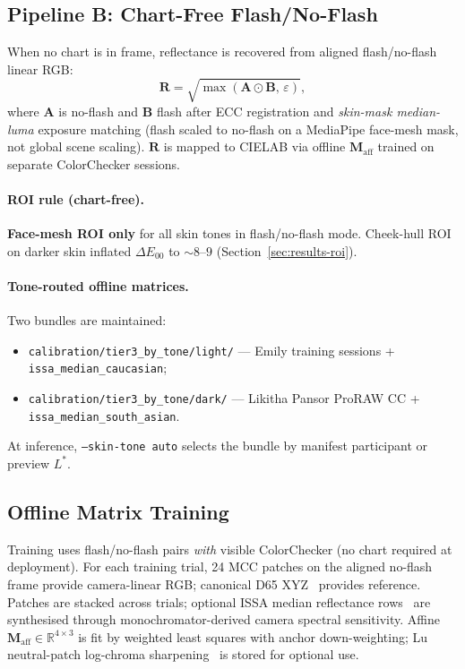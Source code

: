 \documentclass[11pt]{article}
\newcommand{\deee}{\ensuremath{\Delta E_{00}}}
\newcommand{\Maff}{\mathbf{M}_{\mathrm{aff}}}
\newcommand{\Rvec}{\mathbf{R}}
\begin{document}
\subsection{Pipeline B: Chart-Free Flash/No-Flash}

When no chart is in frame, reflectance is recovered from aligned flash/no-flash linear RGB:
\begin{equation}\label{eq:reflectance}
  \Rvec = \sqrt{\max(\mathbf{A}\odot\mathbf{B},\,\varepsilon)},
\end{equation}
where $\mathbf{A}$ is no-flash and $\mathbf{B}$ flash after ECC registration and \emph{skin-mask median-luma} exposure matching (flash scaled to no-flash on a MediaPipe face-mesh mask, not global scene scaling).
$\Rvec$ is mapped to CIELAB via offline $\Maff$ trained on separate ColorChecker sessions.

\paragraph{ROI rule (chart-free).}
\textbf{Face-mesh ROI only} for all skin tones in flash/no-flash mode.
Cheek-hull ROI on darker skin inflated $\deee$ to ${\sim}8$--$9$ (Section~\ref{sec:results-roi}).

\paragraph{Tone-routed offline matrices.}
Two bundles are maintained:
\begin{itemize}[noitemsep]
  \item \texttt{calibration/tier3\_by\_tone/light/} --- Emily training sessions + \texttt{issa\_median\_caucasian};
  \item \texttt{calibration/tier3\_by\_tone/dark/} --- Likitha Pansor ProRAW CC + \texttt{issa\_median\_south\_asian}.
\end{itemize}
At inference, \texttt{--skin-tone auto} selects the bundle by manifest participant or preview $L^*$.

\subsection{Offline Matrix Training}

Training uses flash/no-flash pairs \emph{with} visible ColorChecker (no chart required at deployment).
For each training trial, 24 MCC patches on the aligned no-flash frame provide camera-linear RGB; canonical D65 XYZ~\cite{BabelColorMCC} provides reference.
Patches are stacked across trials; optional ISSA median reflectance rows~\cite{issa2025} are synthesised through monochromator-derived camera spectral sensitivity.
Affine $\Maff\in\mathbb{R}^{4\times 3}$ is fit by weighted least squares with anchor down-weighting; Lu neutral-patch log-chroma sharpening~\cite{lu2006practical} is stored for optional use.
\end{document}
